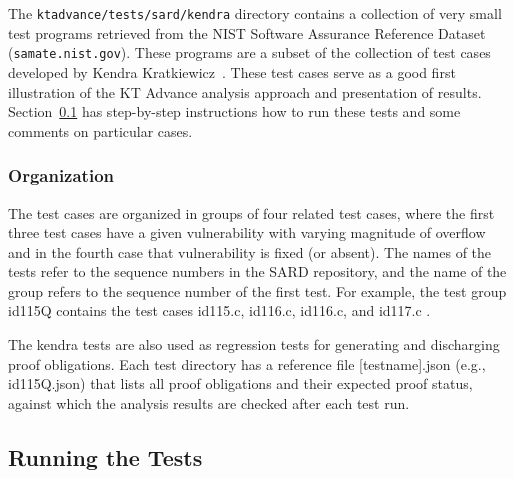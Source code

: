 \documentclass[11pt]{article}
\begin{document}
The {\tt ktadvance/tests/sard/kendra} directory contains a collection of very small test
programs retrieved from the NIST Software Assurance Reference Dataset ({\tt samate.nist.gov}).
These programs are a subset of the collection of test cases developed by 
Kendra Kratkiewicz~\cite{}. These test cases serve as a good first illustration of
the KT Advance analysis approach and presentation of results. 
Section~\ref{sec:runkendra} has step-by-step instructions how to run these tests
and some comments on particular cases.

\subsubsection{Organization}
The test cases are organized in groups of four related test cases, where the first 
three test cases have a given vulnerability with varying magnitude of overflow and 
in the fourth case that vulnerability is fixed (or absent). The names of the tests 
refer to the sequence numbers in the SARD repository, and the name of the group 
refers to the sequence number of the first test. For example, the test group id115Q 
contains the test cases id115.c, id116.c, id116.c, and id117.c . 

The kendra tests are also used as regression tests for generating and discharging proof 
obligations.
Each test directory has a reference file [testname].json (e.g., id115Q.json) that lists 
all proof obligations
and their expected proof status, against which the analysis results are checked after
each test run.

\subsection{Running the Tests}
\label{sec:runkendra}
\end{document}
